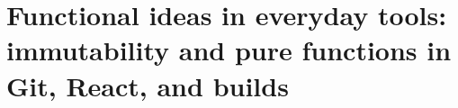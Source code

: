 \chapter{Functional ideas in everyday tools: immutability and pure functions in Git, React, and builds}
\label{ch:functional-ideas-in-everyday-tools}

